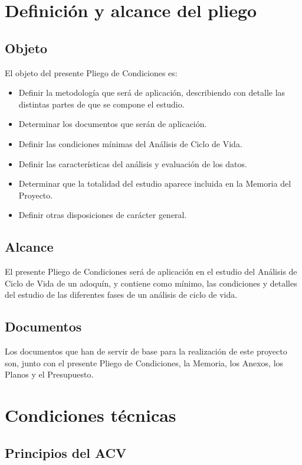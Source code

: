 
\setcounter{chapter}{0}
\chapter{Definición y alcance del pliego}
\section{Objeto}
El objeto del presente Pliego de Condiciones es:
\begin{itemize}
  \item Definir la metodología que será de aplicación, describiendo con detalle las distintas partes de que se compone el estudio.
  \item Determinar los documentos que serán de aplicación.
  \item Definir las condiciones mínimas del Análisis de Ciclo de Vida.
  \item Definir las características del análisis y evaluación de los datos.
  \item Determinar que la totalidad del estudio aparece incluida en la Memoria del Proyecto.
  \item Definir otras disposiciones de carácter general.

\end{itemize}

\section{Alcance}
El presente Pliego de Condiciones será de aplicación en el estudio del Análisis de Ciclo de Vida de un adoquín, y contiene como mínimo, las condiciones y detalles del estudio de las diferentes fases de un análisis de ciclo de vida.

\section{Documentos}
Los documentos que han de servir de base para la realización de este proyecto son, junto con el presente Pliego de Condiciones, la Memoria, los Anexos, los Planos y el Presupuesto.

\chapter{Condiciones técnicas}

\section{Principios del ACV}
